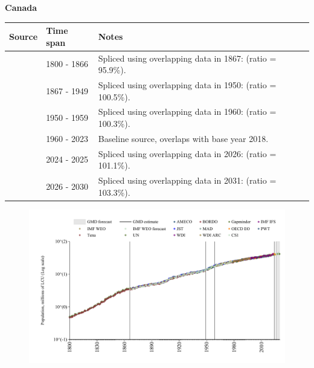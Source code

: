\documentclass[12pt,a4paper,landscape]{article}
\begin{document}
\begin{adjustbox}{max totalsize={\paperwidth}{\paperheight},center}
\begin{minipage}[t][\textheight][t]{\textwidth}
\vspace*{0.5cm}
{}
\begin{center}
{\Large\bfseries Canada}
\end{center}
\vspace{0.5cm}
\begin{table}[H]
\centering
\small
\begin{tabular}{|l|l|l|}
\hline
\textbf{Source} & \textbf{Time span} & \textbf{Notes} \\
\hline
\rowcolor{white}\cite{Gapminder}& 1800 - 1866 &Spliced using overlapping data in 1867: (ratio = 95.9\%).\\
\rowcolor{lightgray}\cite{CS1_CAN}& 1867 - 1949 &Spliced using overlapping data in 1950: (ratio = 100.5\%).\\
\rowcolor{white}\cite{IMF_IFS}& 1950 - 1959 &Spliced using overlapping data in 1960: (ratio = 100.3\%).\\
\rowcolor{lightgray}\cite{WDI}& 1960 - 2023 &Baseline source, overlaps with base year 2018.\\
\rowcolor{white}\cite{OECD_EO}& 2024 - 2025 &Spliced using overlapping data in 2026: (ratio = 101.1\%).\\
\rowcolor{lightgray}\cite{Gapminder}& 2026 - 2030 &Spliced using overlapping data in 2031: (ratio = 103.3\%).\\
\hline
\end{tabular}
\end{table}
\begin{figure}[H]
\centering
\includegraphics[width=\textwidth,height=0.6\textheight,keepaspectratio]{graphs/CAN_pop.pdf}
\end{figure}
\end{minipage}
\end{adjustbox}
\end{document}
